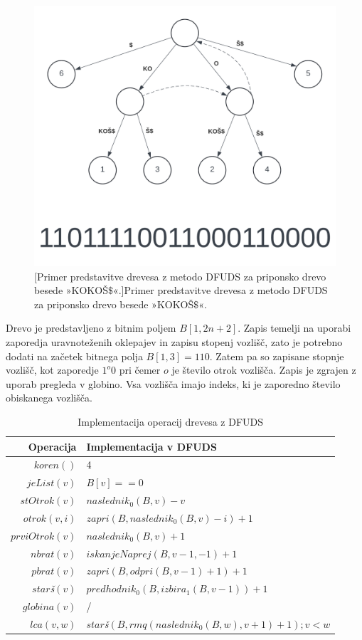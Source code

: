 \begin{figure}[htb]
    \begin{center}
        \includegraphics[width=.8\textwidth]{Slike/KokosSTDFUDS.png}
        [Primer predstavitve drevesa z metodo DFUDS za priponsko drevo besede »KOKOŠ$\$$«.]{Primer predstavitve drevesa z metodo DFUDS za priponsko drevo besede »KOKOŠ$\$$«.} 
        \label{fig:DFUDS}
    \end{center}
\end{figure}

Drevo je predstavljeno z bitnim poljem $B[1,2n+2]$. Zapis temelji na uporabi zaporedja uravnoteženih oklepajev in zapisu stopenj vozlišč, zato je potrebno dodati na začetek bitnega polja $B[1,3]=110$. Zatem pa so zapisane stopnje vozlišč, kot zaporedje $1^o0$ pri čemer $o$ je število otrok vozlišča. Zapis je zgrajen z uporab pregleda v globino. Vsa vozlišča imajo indeks, ki je zaporedno število obiskanega vozlišča.

\begin{table}[htb]
    \centering
    \caption{Implementacija operacij drevesa z DFUDS}
    \begin{tabular}{r|l}
\textbf{Operacija}& \textbf{Implementacija v DFUD}S \\\hline
         $koren()$& 4\\
         $jeList(v)$& $B[v]==0$\\
         $stOtrok(v)$& $naslednik_0(B,v)-v$\\
         $otrok(v,i)$& $zapri(B, naslednik_0(B, v) - i)+1$\\
         $prviOtrok(v)$& $naslednik_0(B,v)+1$\\
         $nbrat(v)$& $iskanjeNaprej(B,v-1,-1)+1$ \\
         $pbrat(v)$& $zapri(B,odpri(B,v-1)+1)+1$ \\
         $star$\textit{š}$(v)$& $predhodnik_0(B,izbira_1(B,v-1))+1$ \\
         $globina(v)$& / \\
         $lca(v,w)$&  $star$\textit{š}$(B,rmq(naslednik_0(B,w),v+1)+1);v<w$\\

    \end{tabular}
    \label{tab:DFUDSop}
\end{table}


